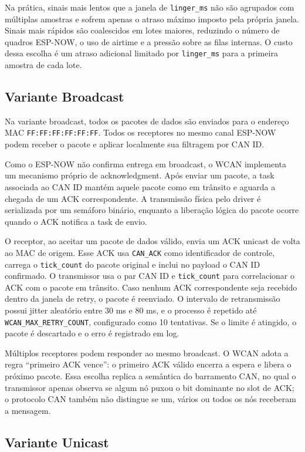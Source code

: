\documentclass{article}
\begin{document}
    Na prática, sinais mais lentos que a janela de \texttt{linger_ms} não são agrupados com múltiplas amostras e sofrem apenas o atraso máximo imposto pela própria janela. Sinais mais rápidos são coalescidos em lotes maiores, reduzindo o número de quadros ESP-NOW, o uso de airtime e a pressão sobre as filas internas. O custo dessa escolha é um atraso adicional limitado por \texttt{linger_ms} para a primeira amostra de cada lote.

    \subsection{Variante Broadcast}

    Na variante broadcast, todos os pacotes de dados são enviados para o endereço MAC \texttt{FF:FF:FF:FF:FF:FF}. Todos os receptores no mesmo canal ESP-NOW podem receber o pacote e aplicar localmente sua filtragem por CAN ID.

    Como o ESP-NOW não confirma entrega em broadcast, o WCAN implementa um mecanismo próprio de acknowledgment. Após enviar um pacote, a task associada ao CAN ID mantém aquele pacote como em trânsito e aguarda a chegada de um ACK correspondente. A transmissão física pelo driver é serializada por um semáforo binário, enquanto a liberação lógica do pacote ocorre quando o ACK notifica a task de envio.

    O receptor, ao aceitar um pacote de dados válido, envia um ACK unicast de volta ao MAC de origem. Esse ACK usa \texttt{CAN_ACK} como identificador de controle, carrega o \texttt{tick_count} do pacote original e inclui no payload o CAN ID confirmado. O transmissor usa o par CAN ID e \texttt{tick_count} para correlacionar o ACK com o pacote em trânsito. Caso nenhum ACK correspondente seja recebido dentro da janela de retry, o pacote é reenviado. O intervalo de retransmissão possui jitter aleatório entre 30 ms e 80 ms, e o processo é repetido até \texttt{WCAN_MAX_RETRY_COUNT}, configurado como 10 tentativas. Se o limite é atingido, o pacote é descartado e o erro é registrado em log.

    Múltiplos receptores podem responder ao mesmo broadcast. O WCAN adota a regra ``primeiro ACK vence'': o primeiro ACK válido encerra a espera e libera o próximo pacote. Essa escolha replica a semântica do barramento CAN, no qual o transmissor apenas observa se algum nó puxou o bit dominante no slot de ACK; o protocolo CAN também não distingue se um, vários ou todos os nós receberam a mensagem.

    \subsection{Variante Unicast}
\end{document}
